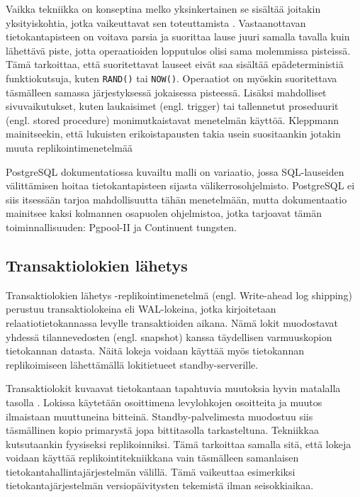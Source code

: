 \documentclass[finnish,twoside,censored,csm,sw-track-2018]{HYthesisML}
\begin{document}
Vaikka tekniikka on konseptina melko yksinkertainen se sisältää joitakin yksityiskohtia, jotka vaikeuttavat sen toteuttamista \cite{Kleppmann}. Vastaanottavan tietokantapisteen on voitava parsia ja suorittaa lause juuri samalla tavalla kuin lähettävä piste, jotta operaatioiden lopputulos olisi sama molemmissa pisteissä. Tämä tarkoittaa, että suoritettavat lauseet eivät saa sisältää epädeterministiä funktiokutsuja, kuten \verb+RAND()+ tai \verb+NOW()+. Operaatiot on myöskin suoritettava täsmälleen samassa järjestyksessä jokaisessa pisteessä. Lisäksi mahdolliset sivuvaikutukset, kuten laukaisimet (engl. trigger) tai tallennetut proseduurit (engl. stored procedure) monimutkaistavat menetelmän käyttöä. Kleppmann mainitseekin, että lukuisten erikoistapausten takia usein suositaankin jotakin muuta replikointimenetelmää \citep{Kleppmann}

PostgreSQL dokumentatiossa \citep{postgres-replication-solutions} kuvailtu malli on variaatio, jossa SQL-lauseiden välittämisen hoitaa tietokantapisteen sijasta välikerrosohjelmisto. PostgreSQL ei siis itsessään tarjoa mahdollisuutta tähän menetelmään, mutta dokumentaatio mainitsee kaksi kolmannen osapuolen ohjelmistoa, jotka tarjoavat tämän toiminnallisuuden: Pgpool-II ja Continuent tungsten.

\subsection{Transaktiolokien lähetys}

Transaktiolokien lähetys -replikointimenetelmä (engl. Write-ahead log shipping) perustuu transaktiolokeina eli WAL-lokeina, jotka kirjoitetaan relaatiotietokannassa levylle transaktioiden aikana. Nämä lokit muodostavat yhdessä tilannevedosten (engl. snapshot) kanssa täydellisen varmuuskopion tietokannan datasta. Näitä lokeja voidaan käyttää myös tietokannan replikoimiseen lähettämällä lokitietueet standby-serverille. \cite{Kleppmann}

Transaktiolokit kuvaavat tietokantaan tapahtuvia muutoksia hyvin matalalla tasolla \citep{Kleppmann}. Lokissa käytetään osoittimena levylohkojen osoitteita ja muutos ilmaistaan muuttuneina bitteinä. Standby-palvelimesta muodostuu siis täsmällinen kopio primarystä jopa bittitasolla tarkasteltuna. Tekniikkaa kutsutaankin fyysiseksi replikoinniksi. Tämä tarkoittaa samalla sitä, että lokeja voidaan käyttää replikointitekniikkana vain täsmälleen samanlaisen tietokantahallintajärjestelmän välillä. Tämä vaikeuttaa esimerkiksi tietokantajärjestelmän versiopäivitysten tekemistä ilman seisokkiaikaa.
\end{document}
